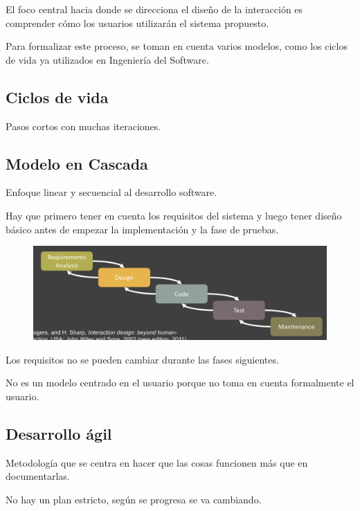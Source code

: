 \documentclass[12pt, twoside, openright]{report} %
\begin{document}
    El foco central hacia donde se direcciona el diseño de la
    interacción es comprender cómo los usuarios utilizarán el sistema
    propuesto.

    Para formalizar este proceso, se toman en cuenta varios modelos,
    como los ciclos de vida ya utilizados en Ingeniería del Software.

    
\subsection{Ciclos de vida}
    Pasos cortos con muchas iteraciones.

\subsection{Modelo en Cascada}


    Enfoque linear y secuencial al desarrollo software.

    Hay que primero tener en cuenta los requisitos del sistema y luego
    tener diseño básico antes de empezar la implementación y la fase de
    pruebas.
    \begin{figure}[H]
			{\includegraphics[scale=.25]{Untitled 28.png}}
		\end{figure}

    Los requisitos no se pueden cambiar durante las fases siguientes.

    No es un modelo centrado en el usuario porque no toma en cuenta
    formalmente el usuario.

    
\subsection{Desarrollo ágil}



    Metodología que se centra en hacer que las cosas funcionen más que
    en documentarlas.

    No hay un plan estricto, según se progresa se va cambiando.
\end{document}
